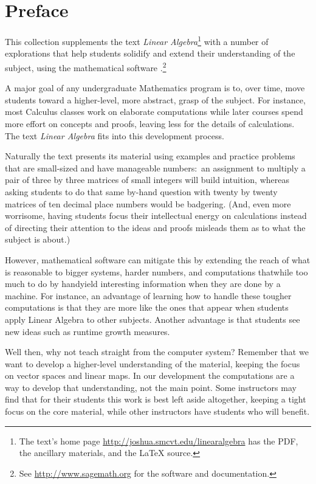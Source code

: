 \chapter*{Preface}\pagestyle{preface}\thispagestyle{preface}


This collection supplements the text \nocite{Hefferon12}
\textit{Linear Algebra}\footnote{The text's home page 
\protect\url{http://joshua.smcvt.edu/linearalgebra} 
has the PDF, the ancillary materials, and the \protect\LaTeX{} source.}
with a number of explorations that help students
solidify and extend their understanding of the subject, 
using the mathematical software \Sage{}.\footnote{See 
\url{http://www.sagemath.org} for the software and documentation.}

A major goal of any undergraduate Mathematics program is to,
over time, move students 
toward a higher-level, more abstract, grasp of the subject.
For instance, most Calculus classes work on elaborate computations
while later courses spend more effort on concepts and proofs, leaving 
less for the details of calculations.  
The text \textit{Linear Algebra} fits into
this development process.

Naturally the text presents its material 
using examples and practice problems
that are small-sized and have manageable numbers:~an 
assignment to multiply a pair of three by three matrices
of small integers will build intuition, whereas asking students to do that same 
by-hand question with twenty by twenty matrices
of ten decimal place numbers would be badgering. 
(And, even more worrisome, having students  
focus their intellectual energy on calculations instead of directing
their attention to the ideas and proofs misleads them as to
what the subject is about.)

However, mathematical software can mitigate this by extending the reach of
what is reasonable
to bigger systems, harder numbers, and computations 
that\Dash while too much to do by hand\Dash yield
interesting information when they are done by a machine.
For instance, an advantage of learning how to handle these 
tougher computations is that 
they are more like the ones that appear when students apply Linear 
Algebra to other subjects.
Another advantage is that students see new ideas such as 
runtime growth measures.

Well then, why 
not teach straight from the computer system?
Remember that we want to develop a higher-level understanding of the 
material, 
keeping the focus on vector spaces and linear maps.
In our development 
the computations are a way to develop that understanding, not the main point.
Some instructors may find 
that for their students
this work is best left aside altogether, keeping a tight focus on the
core material, while other instructors
have students who will benefit.


